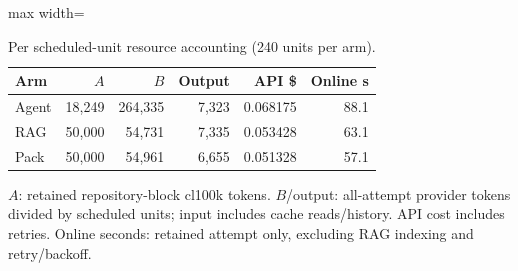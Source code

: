 \begin{table}[t]
\centering
\caption{Per scheduled-unit resource accounting (240 units per arm).}\label{tab:cost}
\small
\begin{adjustbox}{max width=\textwidth}\begin{tabular}{lrrrrr}
\toprule
Arm & $A$ & $B$ & Output & API \$ & Online s \\
\midrule
Agent & 18,249 & 264,335 & 7,323 & 0.068175 & 88.1 \\
RAG & 50,000 & 54,731 & 7,335 & 0.053428 & 63.1 \\
Pack & 50,000 & 54,961 & 6,655 & 0.051328 & 57.1 \\
\bottomrule
\end{tabular}\end{adjustbox}
\par\vspace{2pt}\begin{minipage}{\textwidth}\footnotesize $A$: retained repository-block cl100k tokens. $B$/output: all-attempt provider tokens divided by scheduled units; input includes cache reads/history. API cost includes retries. Online seconds: retained attempt only, excluding RAG indexing and retry/backoff.\end{minipage}
\end{table}
